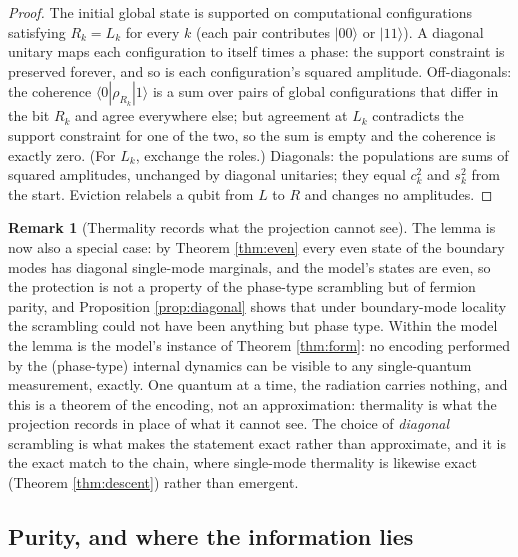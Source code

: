 \documentclass[11pt]{article}
\theoremstyle{definition}
\newtheorem{remark}[theorem]{Remark}
\begin{document}
\begin{proof}
The initial global state is supported on computational configurations satisfying $R_k = L_k$ for every $k$ (each pair contributes $|00\rangle$ or $|11\rangle$). A diagonal unitary maps each configuration to itself times a phase: the support constraint is preserved forever, and so is each configuration's squared amplitude. Off-diagonals: the coherence $\langle 0|\rho_{R_k}|1\rangle$ is a sum over pairs of global configurations that differ in the bit $R_k$ and agree everywhere else; but agreement at $L_k$ contradicts the support constraint for one of the two, so the sum is empty and the coherence is exactly zero. (For $L_k$, exchange the roles.) Diagonals: the populations are sums of squared amplitudes, unchanged by diagonal unitaries; they equal $c_k^2$ and $s_k^2$ from the start. Eviction relabels a qubit from $L$ to $R$ and changes no amplitudes.
\end{proof}

\begin{remark}[Thermality records what the projection cannot see]\label{rem:receipt}
The lemma is now also a special case: by Theorem \ref{thm:even} every even state of the boundary modes has diagonal single-mode marginals, and the model's states are even, so the protection is not a property of the phase-type scrambling but of fermion parity, and Proposition \ref{prop:diagonal} shows that under boundary-mode locality the scrambling could not have been anything but phase type. Within the model the lemma is the model's instance of Theorem \ref{thm:form}: no encoding performed by the (phase-type) internal dynamics can be visible to any single-quantum measurement, exactly. One quantum at a time, the radiation carries nothing, and this is a theorem of the encoding, not an approximation: thermality is what the projection records in place of what it cannot see. The choice of \emph{diagonal} scrambling is what makes the statement exact rather than approximate, and it is the exact match to the chain, where single-mode thermality is likewise exact (Theorem \ref{thm:descent}) rather than emergent.
\end{remark}

\subsection{Purity, and where the information lies}\label{subsec:where}
\end{document}
